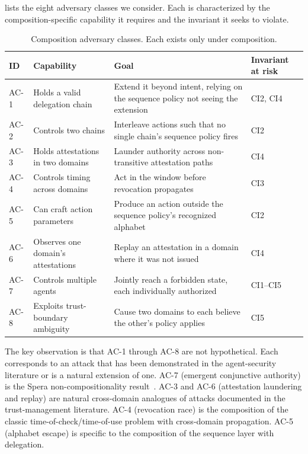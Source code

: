 \documentclass[11pt,a4paper]{article}
\theoremstyle{plain}
\theoremstyle{definition}
\theoremstyle{remark}
\begin{document}
 lists the eight adversary classes we consider. Each is
characterized by the composition-specific capability it requires and the
invariant it seeks to violate.

\begin{table}[t]
\centering
\small
\begin{tabular}{@{}p{0.8cm}p{3.6cm}p{4.2cm}p{4.2cm}@{}}
\toprule
\textbf{ID} & \textbf{Capability} & \textbf{Goal} & \textbf{Invariant at risk} \\
\midrule
AC-1 & Holds a valid delegation chain & Extend it beyond intent, relying on the sequence policy not seeing the extension & CI2, CI4 \\
AC-2 & Controls two chains & Interleave actions such that no single chain's sequence policy fires & CI2 \\
AC-3 & Holds attestations in two domains & Launder authority across non-transitive attestation paths & CI4 \\
AC-4 & Controls timing across domains & Act in the window before revocation propagates & CI3 \\
AC-5 & Can craft action parameters & Produce an action outside the sequence policy's recognized alphabet & CI2 \\
AC-6 & Observes one domain's attestations & Replay an attestation in a domain where it was not issued & CI4 \\
AC-7 & Controls multiple agents & Jointly reach a forbidden state, each individually authorized & CI1--CI5 \\
AC-8 & Exploits trust-boundary ambiguity & Cause two domains to each believe the other's policy applies & CI5 \\
\bottomrule
\end{tabular}
\caption{Composition adversary classes. Each exists only under composition.}
\label{tab:adversaries}
\end{table}

The key observation is that AC-1 through AC-8 are not hypothetical. Each
corresponds to an attack that has been demonstrated in the agent-security
literature or is a natural extension of one. AC-7 (emergent conjunctive
authority) is the Spera non-compositionality
result~\cite{spera2026noncompositionality}. AC-3 and AC-6 (attestation
laundering and replay) are natural cross-domain analogues of attacks documented
in the trust-management literature. AC-4 (revocation race) is the composition
of the classic time-of-check/time-of-use problem with cross-domain
propagation. AC-5 (alphabet escape) is specific to the composition of the
sequence layer with delegation.
\end{document}
